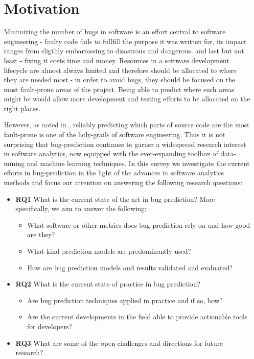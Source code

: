 \documentclass[]{book}
\providecommand{\tightlist}{%
  \setlength{\itemsep}{0pt}\setlength{\parskip}{0pt}}
\begin{document}
\section{Motivation}\label{motivation-2}

Minimizing the number of bugs in software is an effort central to
software engineering - faulty code fails to fullfill the purpose it was
written for, its impact ranges from sligthly embarrassing to disastrous
and dangerous, and last but not least - fixing it costs time and money.
Resources in a software development lifecycle are almost always limited
and therefore should be allocated to where they are needed most - in
order to avoid bugs, they should be focused on the most fault-prone
areas of the project. Being able to predict where such areas might be
would allow more development and testing efforts to be allocated on the
right places.

However, as noted in \citet{DAmbros2012}, reliably predicting which
parts of source code are the most fault-prone is one of the holy-grails
of software engineering. Thus it is not surprising that bug-prediction
continues to garner a widespread research interest in software
analytics, now equipped with the ever-expanding toolbox of data-mining
and machine learning techniques. In this survey we investigate the
current efforts in bug-prediction in the light of the advances in
software analytics methods and focus our attention on answering the
following research questions:

\begin{itemize}
\tightlist
\item
  \textbf{RQ1} What is the current state of the art in bug prediction?
  More specifically, we aim to answer the following:

  \begin{itemize}
  \tightlist
  \item
    What software or other metrics does bug prediction rely on and how
    good are they?
  \item
    What kind prediction models are predominantly used?
  \item
    How are bug prediction models and results validated and evaluated?
  \end{itemize}
\item
  \textbf{RQ2} What is the current state of practice in bug prediction?

  \begin{itemize}
  \tightlist
  \item
    Are bug prediction techniques applied in practice and if so, how?
  \item
    Are the current developments in the field able to provide actionable
    tools for developers?
  \end{itemize}
\item
  \textbf{RQ3} What are some of the open challenges and directions for
  future research?
\end{itemize}
\end{document}
